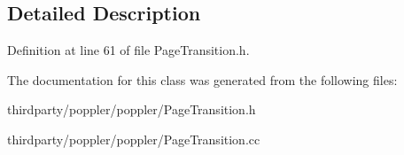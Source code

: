 \subsection{Detailed Description}


Definition at line 61 of file Page\+Transition.\+h.



The documentation for this class was generated from the following files\+:\begin{DoxyCompactItemize}
\item 
thirdparty/poppler/poppler/Page\+Transition.\+h\item 
thirdparty/poppler/poppler/Page\+Transition.\+cc\end{DoxyCompactItemize}
